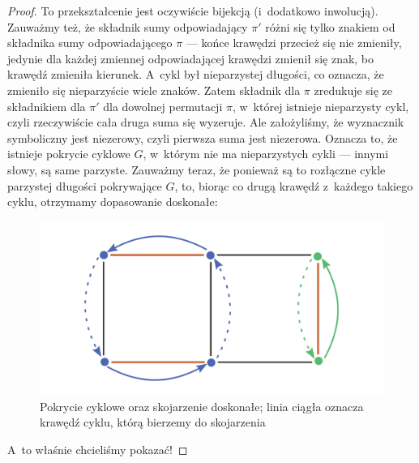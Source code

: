 \begin{proof}
	To przekształcenie jest oczywiście bijekcją (i~dodatkowo inwolucją). Zauważmy też, że składnik sumy odpowiadający $\pi'$ różni się tylko znakiem od składnika sumy odpowiadającego $\pi$ --- końce krawędzi przecież się nie zmieniły, jedynie dla każdej zmiennej odpowiadającej krawędzi zmienił się znak, bo krawędź zmieniła kierunek. A~cykl był nieparzystej długości, co oznacza, że zmieniło się nieparzyście wiele znaków. Zatem składnik dla $\pi$ zredukuje się ze składnikiem dla $\pi'$ dla dowolnej permutacji $\pi$, w~której istnieje nieparzysty cykl, czyli rzeczywiście cała druga suma się wyzeruje. Ale założyliśmy, że wyznacznik symboliczny jest niezerowy, czyli pierwsza suma jest niezerowa. Oznacza to, że istnieje pokrycie cyklowe $G$, w~którym nie ma nieparzystych cykli --- innymi słowy, są same parzyste. Zauważmy teraz, że ponieważ są to rozłączne cykle parzystej długości pokrywające $G$, to, biorąc co drugą krawędź z~każdego takiego cyklu, otrzymamy dopasowanie doskonałe:

	\begin{figure}[H]
		\centering
		\includegraphics[scale=0.75]{images/tutte/matching_from_cover.png}
		\caption{Pokrycie cyklowe oraz skojarzenie doskonałe; linia ciągła oznacza krawędź cyklu, którą bierzemy do skojarzenia }
	\end{figure}

	A~to właśnie chcieliśmy pokazać!
\end{proof}